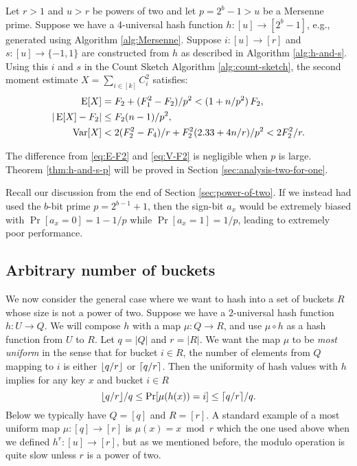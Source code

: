 \begin{theorem}\label{thm:h-and-s-p}
   Let $r>1$ and $u>r$ be powers of two and let $p=2^b-1>u$ be a
   Mersenne prime.
   Suppose we have a 4-universal hash function $h:[u]\to[2^b-1]$, e.g.,
   generated using Algorithm \ref{alg:Mersenne}. Suppose
   $i:[u]\to[r]$ and
   $s:[u]\to\{-1,1\}$ are constructed from $h$ as described in
   Algorithm \ref{alg:h-and-s}. Using this $i$ and $s$ 
   in the Count Sketch Algorithm \ref{alg:count-sketch}, the second moment 
   estimate $X=\sum_{i\in[k]} C_i^2$ satisfies:
   \begin{align}
      \operatorname*{E}[X]&=F_2+(F_1^2-F_2)/p^2 < (1+n/p^2)\,F_2\textnormal,\label{eq:E-F2-p}\\
      | \operatorname*{E}[X] - F_2 | &\le F_2 (n - 1)/p^2, \label{eq:E-F2-p-com}\\
      \operatorname*{Var}[X]&< 2(F_2^2-F_4)/r+F_2^2 (2.33+4 n/r)/p^2<2F_2^2/r.\label{eq:V-F2-p}
   \end{align}
\end{theorem}
The difference from \eqref{eq:E-F2} and \eqref{eq:V-F2} 
is negligible when $p$ is large. Theorem \ref{thm:h-and-s-p} will be
proved in Section \ref{sec:analysis-two-for-one}.

Recall our discussion from the end of Section
\ref{sec:power-of-two}. If we instead had used the $b$-bit prime
$p=2^{b-1}+1$, then the sign-bit $a_x$ would be extremely biased with
$\Pr[a_x=0]=1-1/p$ while $\Pr[a_x=1]=1/p$, leading to extremely poor
performance.


\subsection{Arbitrary number of buckets}\label{sec:most-uniform}
We now consider the general case where we want to hash into a set of
buckets $R$ whose size is not a power of two.  Suppose we have a
$2$-universal hash function $h:U\to Q$.  We will compose $h$ with a
map $\mu:Q\to R$, and use $\mu\circ h$ as a hash function from $U$ to
$R$.  Let $q=|Q|$ and $r=|R|$.  We want the map $\mu$ to be \emph{most
  uniform} in the sense that for bucket $i\in R$, the number of
elements from $Q$ mapping to $i$ is either $\lfloor {q/r} \rfloor$ or
$\lceil {q/r}\rceil$.  Then the uniformity of hash values with $h$ implies for
any key $x$ and bucket $i\in R$ \[\lfloor {q/r} \rfloor/q\leq
\Pr[\mu(h(x))=i]\leq \lceil {q/r}\rceil/q.\] Below we typically have $Q=[q]$
and $R=[r]$.  A standard example of a most uniform map $\mu:[q]\to[r]$
is $\mu(x)=x\bmod r$ which the one used above when we defined
$h^r:[u]\to[r]$, but as we mentioned before, the modulo operation is
quite slow unless $r$ is a power of two.

